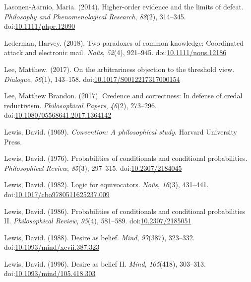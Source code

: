 \documentclass[
  12pt,
  letterpaper,
]{scrbook}
\newlength{\cslhangindent}
\newenvironment{CSLReferences}[2] %
 {\begin{list}{}{%
  \setlength{\itemindent}{0pt}
  \setlength{\leftmargin}{0pt}
  \setlength{\parsep}{0pt}
  \ifodd #1
   \setlength{\leftmargin}{\cslhangindent}
   \setlength{\itemindent}{-1\cslhangindent}
  \fi
  \setlength{\itemsep}{#2\baselineskip}}}
 {\end{list}}
\begin{document}
\begin{CSLReferences}{1}{0}
Lasonen-Aarnio, Maria. (2014). Higher-order evidence and the limits of
defeat. \emph{Philosophy and Phenomenological Research}, \emph{88}(2),
314--345.
doi:\href{https://doi.org/10.1111/phpr.12090}{10.1111/phpr.12090}

Lederman, Harvey. (2018). Two paradoxes of common knowledge: Coordinated
attack and electronic mail. \emph{No{û}s}, \emph{52}(4), 921--945.
doi:\href{https://doi.org/10.1111/nous.12186}{10.1111/nous.12186}

Lee, Matthew. (2017). On the arbitrariness objection to the threshold
view. \emph{Dialogue}, \emph{56}(1), 143--158.
doi:\href{https://doi.org/10.1017/S0012217317000154}{10.1017/S0012217317000154}

Lee, Matthew Brandon. (2017). Credence and correctness: In defense of
credal reductivism. \emph{Philosophical Papers}, \emph{46}(2), 273--296.
doi:\href{https://doi.org/10.1080/05568641.2017.1364142}{10.1080/05568641.2017.1364142}

Lewis, David. (1969). \emph{Convention: A philosophical study}. Harvard
University Press.

Lewis, David. (1976). Probabilities of conditionals and conditional
probabilities. \emph{Philosophical Review}, \emph{85}(3), 297--315.
doi:\href{https://doi.org/10.2307/2184045}{10.2307/2184045}

Lewis, David. (1982). Logic for equivocators. \emph{No{û}s},
\emph{16}(3), 431--441.
doi:\href{https://doi.org/10.1017/cbo9780511625237.009}{10.1017/cbo9780511625237.009}

Lewis, David. (1986). Probabilities of conditionals and conditional
probabilities {II}. \emph{Philosophical Review}, \emph{95}(4), 581--589.
doi:\href{https://doi.org/10.2307/2185051}{10.2307/2185051}

Lewis, David. (1988). Desire as belief. \emph{Mind}, \emph{97}(387),
323--332.
doi:\href{https://doi.org/10.1093/mind/xcvii.387.323}{10.1093/mind/xcvii.387.323}

Lewis, David. (1996). Desire as belief {II}. \emph{Mind},
\emph{105}(418), 303--313.
doi:\href{https://doi.org/10.1093/mind/105.418.303}{10.1093/mind/105.418.303}


\end{CSLReferences}
\end{document}
